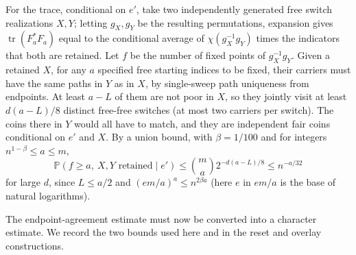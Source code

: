 For the trace, conditional on \(e'\), take two independently generated free switch realizations \(X,Y\); letting \(g_X,g_Y\) be the resulting permutations, expansion gives \(\operatorname{tr}(F_a^*F_a)\) equal to the conditional average of \(\chi(g_X^{-1}g_Y)\) times the indicators that both are retained. Let \(f\) be the number of fixed points of \(g_X^{-1}g_Y\). Given a retained \(X\), for any \(a\) specified free starting indices to be fixed, their carriers must have the same paths in \(Y\) as in \(X\), by single-sweep path uniqueness from endpoints. At least \(a-L\) of them are not poor in \(X\), so they jointly visit at least \(d(a-L)/8\) distinct free-free switches (at most two carriers per switch). The coins there in \(Y\) would all have to match, and they are independent fair coins conditional on \(e'\) and \(X\). By a union bound, with \(\beta=1/100\) and for integers \(n^{1-\beta}\le a\le m\),
\begin{equation}
 \mathbb P(f\ge a,\ X,Y\text{ retained}\mid e')
 \le \binom{m}{a} 2^{-d(a-L)/8}
 \le n^{-a/32} \label{special:burn-active:eq:7}
\end{equation}
for large \(d\), since \(L\le a/2\) and \((em/a)^a\le n^{2\beta a}\) (here \(e\) in \(em/a\) is the base of natural logarithms).

The endpoint-agreement estimate must now be converted into a character estimate. We record the two bounds used here and in the reset and overlay constructions.

